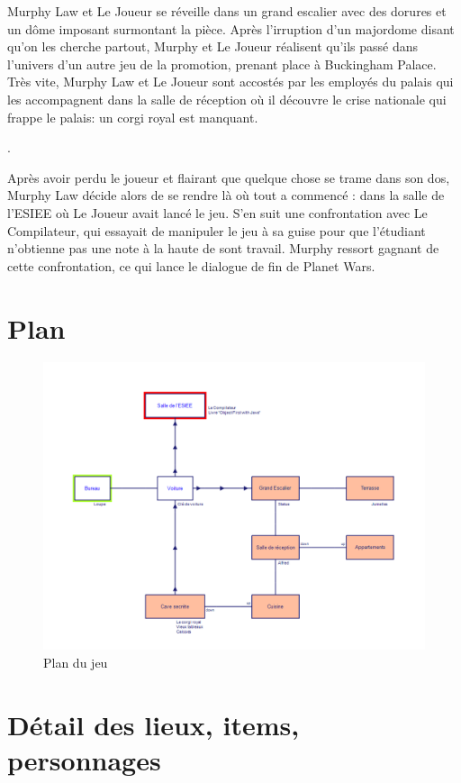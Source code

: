 Murphy Law et Le Joueur se réveille dans un grand escalier avec des dorures et un dôme imposant surmontant la pièce. Après l'irruption d'un majordome disant qu'on les cherche partout, Murphy et Le Joueur réalisent qu'ils passé dans l'univers d'un autre jeu de la promotion, prenant place à Buckingham Palace. Très vite, Murphy Law et Le Joueur sont accostés par les employés du palais qui les accompagnent dans la salle de réception où il découvre le crise nationale qui frappe le palais: un corgi royal est manquant.

.

Après avoir perdu le joueur et flairant que quelque chose se trame dans son dos, Murphy Law décide alors de se rendre là où tout a commencé : dans la salle de l'ESIEE où Le Joueur avait lancé le jeu. S'en suit une confrontation avec Le Compilateur, qui essayait de manipuler le jeu à sa guise pour que  l'étudiant n'obtienne pas une note à la haute de sont travail. Murphy ressort gagnant de cette confrontation, ce qui lance le dialogue de fin de Planet Wars.

\section{Plan}

\begin{figure}[H]
  \includegraphics[width=\textwidth,height=\textheight,keepaspectratio]{./media/plan.png}
  \caption{Plan du jeu}
\end{figure}

\section{Détail des lieux, items, personnages}

